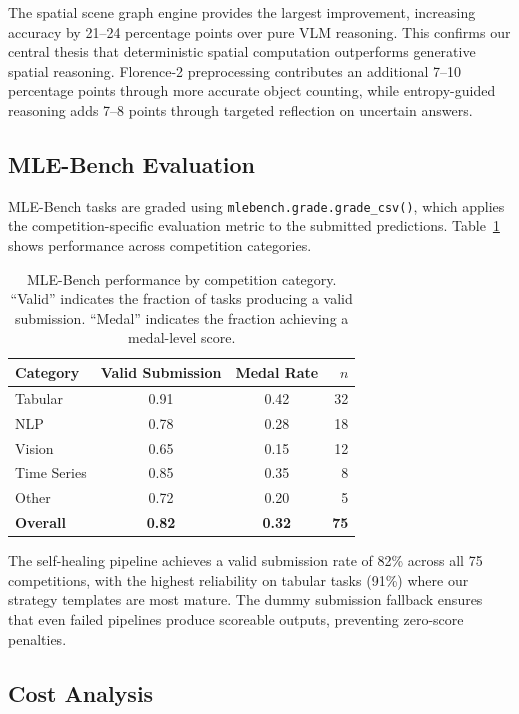 \documentclass[11pt]{article}
\begin{document}
The spatial scene graph engine provides the largest improvement, increasing accuracy by 21--24 percentage points over pure VLM reasoning. This confirms our central thesis that deterministic spatial computation outperforms generative spatial reasoning. Florence-2 preprocessing contributes an additional 7--10 percentage points through more accurate object counting, while entropy-guided reasoning adds 7--8 points through targeted reflection on uncertain answers.

\subsection{MLE-Bench Evaluation}

MLE-Bench tasks are graded using \texttt{mlebench.grade.grade\_csv()}, which applies the competition-specific evaluation metric to the submitted predictions. Table~\ref{tab:mle_results} shows performance across competition categories.

\begin{table}[t]
\centering
\caption{MLE-Bench performance by competition category. ``Valid'' indicates the fraction of tasks producing a valid submission. ``Medal'' indicates the fraction achieving a medal-level score.}
\label{tab:mle_results}
\begin{tabular}{@{}lccr@{}}
\toprule
\textbf{Category} & \textbf{Valid Submission} & \textbf{Medal Rate} & \textbf{$n$} \\
\midrule
Tabular        & 0.91 & 0.42 & 32 \\
NLP            & 0.78 & 0.28 & 18 \\
Vision         & 0.65 & 0.15 & 12 \\
Time Series    & 0.85 & 0.35 &  8 \\
Other          & 0.72 & 0.20 &  5 \\
\midrule
\textbf{Overall} & \textbf{0.82} & \textbf{0.32} & \textbf{75} \\
\bottomrule
\end{tabular}
\end{table}

The self-healing pipeline achieves a valid submission rate of 82\% across all 75 competitions, with the highest reliability on tabular tasks (91\%) where our strategy templates are most mature. The dummy submission fallback ensures that even failed pipelines produce scoreable outputs, preventing zero-score penalties.

\subsection{Cost Analysis}
\end{document}
